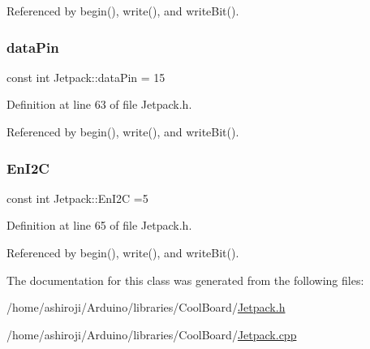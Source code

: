 Referenced by begin(), write(), and write\+Bit().

\mbox{\label{classJetpack_a3d669a56e93c71dd25f970d4ed7d0c00}} 
\subsubsection{\texorpdfstring{data\+Pin}{dataPin}}
{\footnotesize\ttfamily const int Jetpack\+::data\+Pin = 15\hspace{0.3cm}{\ttfamily [private]}}



Definition at line 63 of file Jetpack.\+h.



Referenced by begin(), write(), and write\+Bit().

\mbox{\label{classJetpack_a81df984fb4cea98c71aa1a1cfcdfe814}} 
\subsubsection{\texorpdfstring{En\+I2C}{EnI2C}}
{\footnotesize\ttfamily const int Jetpack\+::\+En\+I2C =5\hspace{0.3cm}{\ttfamily [private]}}



Definition at line 65 of file Jetpack.\+h.



Referenced by begin(), write(), and write\+Bit().



The documentation for this class was generated from the following files\+:\begin{DoxyCompactItemize}
\item 
/home/ashiroji/\+Arduino/libraries/\+Cool\+Board/\hyperlink{Jetpack_8h}{Jetpack.\+h}\item 
/home/ashiroji/\+Arduino/libraries/\+Cool\+Board/\hyperlink{Jetpack_8cpp}{Jetpack.\+cpp}\end{DoxyCompactItemize}
